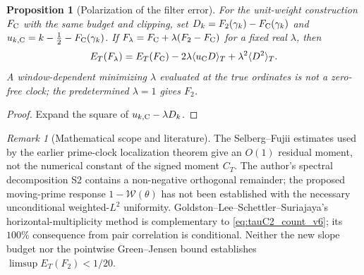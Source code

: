 \documentclass[11pt,reqno]{amsart}
\makeatletter
\let\CG@origcite\cite
\renewcommand*{\cite}[2][]{\def\CG@citekey{#2}%
  \ifx\relax#1\relax\CG@origcite{#2}\else\CG@origcite[#1]{#2}\fi}
\numberwithin{equation}{section}
\newtheorem{proposition}[theorem]{Proposition}
\theoremstyle{definition}
\theoremstyle{remark}
\newtheorem{remark}[theorem]{Remark}
\makeatother
\begin{document}
\begin{proposition}[Polarization of the filter error]
\label{prop:tauC2_polar_v7}
For the unit-weight construction $F_{\rm C}$ with the same
budget and clipping, set
$D_k=F_2(\gamma_k)-F_{\rm C}(\gamma_k)$ and
$u_{k,\rm C}=k-\frac12-F_{\rm C}(\gamma_k)$.
If $F_\lambda=F_{\rm C}+\lambda(F_2-F_{\rm C})$
for a fixed real $\lambda$, then
\begin{equation}
 E_T(F_\lambda)=E_T(F_{\rm C})
 -2\lambda\langle u_{\rm C}D\rangle_T
 +\lambda^2\langle D^2\rangle_T.
 \label{eq:tauC2_polar_v7}
\end{equation}
A window-dependent minimizing $\lambda$ evaluated at the
true ordinates is \emph{not} a zero-free clock; the
predetermined $\lambda=1$ gives $F_2$.
\end{proposition}
\begin{proof}
Expand the square of $u_{k,\rm C}-\lambda D_k$.
\end{proof}

\begin{remark}[Mathematical scope and literature]
\label{rem:tauC2_barrier_v7}
The Selberg--Fujii estimates used by the earlier
prime-clock localization theorem give an $O(1)$ residual
moment, not the numerical constant of the signed moment
$C_T$. The author's spectral decomposition S2 contains
a non-negative orthogonal remainder; the proposed moving-prime
response $1-\mathscr W(\theta)$ has not been established
with the necessary unconditional weighted-$L^2$ uniformity.
Goldston--Lee--Schettler--Suriajaya's horizontal-multiplicity
method \cite{GoldstonLeeSchettlerSuriajaya2026} is
complementary to \eqref{eq:tauC2_count_v6};
its $100\%$ consequence from pair correlation is conditional.
Neither the new slope budget nor the pointwise Green--Jensen
bound establishes $\limsup E_T(F_2)<1/20$.
\end{remark}


\end{document}
